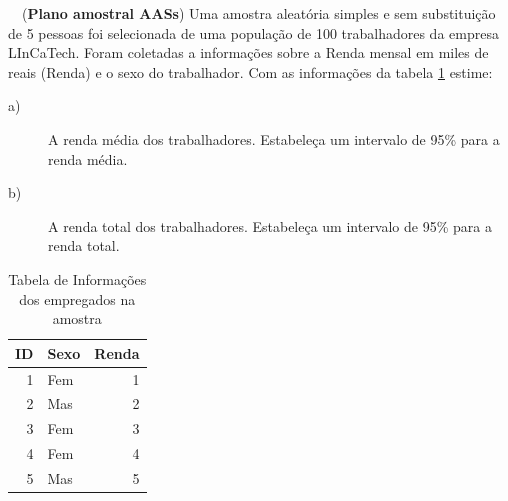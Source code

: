 \documentclass[a4paper,11pt,oneside,twocolumn]{Config/milktest}
\begin{document}
	\medskip 
	\question~~({\bf Plano amostral AASs}) Uma amostra aleatória simples e sem substituição de 5 pessoas foi selecionada de uma população de 100 trabalhadores da empresa LInCaTech. Foram coletadas a informações sobre a Renda mensal em miles de reais (Renda) e o sexo do trabalhador. Com as informações da tabela \ref{ID:Renda} estime:
	
	\begin{description}
		\item[a)] A renda média dos trabalhadores. Estabeleça um intervalo de 95\% para a renda média.
		\item[b)] A renda total dos trabalhadores. Estabeleça um intervalo de 95\% para a renda total. 
	\end{description}
	{\small \begin{table}[H]
			\centering
			\begin{tabular}{rlr}
				\hline
				ID & Sexo & Renda  \\ 
				\hline
				1 & Fem &  1 \\
				2 & Mas &  2\\
				3 & Fem &  3\\
				4 & Fem &  4\\
				5 & Mas &  5\\
				\hline
			\end{tabular}
			\caption{Tabela de Informações dos empregados na amostra} 
			\label{ID:Renda}
		\end{table}
	}
	
\end{document}
